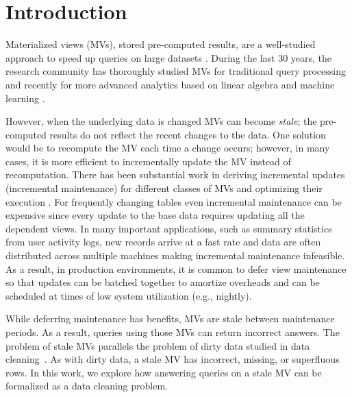 \vspace{-0.5em}
\section{Introduction}
Materialized views (MVs), stored pre-computed results, are a well-studied approach to speed up queries on large datasets \cite{LarsonY85, gupta1995maintenance, chirkova2011materialized}.
During the last 30 years, the research community has thoroughly studied MVs for traditional query processing and recently for more advanced analytics based on linear algebra and machine learning \cite{nikolic2014linview, zhang2014mat}.

However, when the underlying data is changed MVs can become \emph{stale}; the pre-computed results do not reflect the recent changes to the data. 
One solution would be to recompute the MV each time a change occurs; however, in many cases, it is more efficient to incrementally update the MV instead of recomputation.
There has been substantial work in deriving incremental updates (incremental maintenance) for different classes of MVs and optimizing their execution \cite{chirkova2011materialized}.
For frequently changing tables even incremental maintenance can be expensive since every update to the base data requires updating all the dependent views.  
In many important applications, such as summary statistics from user activity logs, new records arrive at a fast rate and data are often distributed across multiple machines making incremental maintenance infeasible. 
As a result, in production environments, it is common to defer view maintenance \cite{chirkova2011materialized, zhou2007lazy, DBLP:conf/sigmod/ColbyGLMT96} so that updates can be batched together to amortize overheads and can be scheduled at times of low system utilization (e.g., nightly).  

While deferring maintenance has benefits, MVs are stale between maintenance periods.
As a result, queries using those MVs can return incorrect answers.
The problem of stale MVs parallels the problem of dirty data studied in data cleaning~\cite{rahm2000data}.
As with dirty data, a stale MV has incorrect, missing, or superfluous rows.
In this work, we explore how answering queries on a stale MV can be formalized as a data cleaning problem. 

